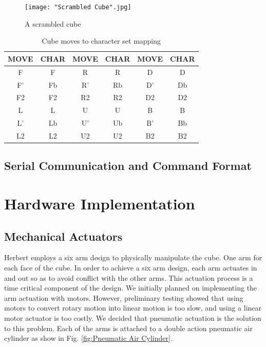 \documentclass[final, letterpaper, 10 pt, conference, twocolumn]{IEEEtran}
\begin{document}
\begin{figure}[!hb]
\centering
\texttt{[image: "Scrambled Cube".jpg]}
\caption{A scrambled cube}
\label{fig:scrambled cube}
\end{figure}

\begin{table}[!ht]
\caption{Cube moves to character set mapping}
\label{table:moves table}
\centering
\begin{tabular}{|c|c|c|c|c|c|}
\hline
\textbf{MOVE} & \textbf{CHAR} & \textbf{MOVE} & \textbf{CHAR} & \textbf{MOVE} & \textbf{CHAR} \\ \hline
F             & F              & R             & R              & D             & D             \\ \hline
F'            & Fb              & R'            & Rb              & D'            & Db            \\ \hline
F2            & F2              & R2            & R2              & D2            & D2             \\ \hline
L             & L              & U             & U             & B             & B             \\ \hline
L'            & Lb              & U'            & Ub             & B'            & Bb             \\ \hline
L2            & L2              & U2            & U2             & B2            & B2             \\ \hline
\end{tabular}
\end{table}


\subsection{Serial Communication and Command Format}

\section{Hardware Implementation}
\subsection{Mechanical Actuators}
\label{sec:Mechanical Actuators}
Herbert employs a six arm design to physically manipulate the cube. One arm for each face of the cube. In order to achieve a six arm design, each arm actuates in and out so as to avoid conflict
with the other arms. This actuation process is a time critical component of
the design.  We initially planned on implementing the
arm actuation with motors.  However, preliminary testing showed that using
motors to convert rotary motion into linear motion is too slow, and using a linear motor
actuator is too costly. We decided that pneumatic actuation is the solution to this problem.  Each of the arms is attached to a double action pneumatic air cylinder as show in Fig. \ref{fig:Pneumatic Air Cylinder}.
\end{document}
